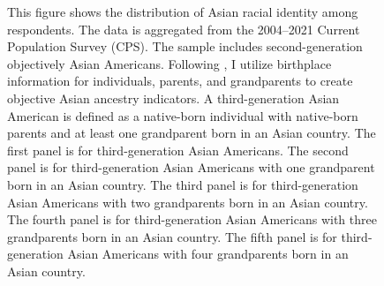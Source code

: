 \begin{landscape}
\begin{figure}[!htb]
\caption*{\footnotesize{This figure shows the distribution of Asian racial identity among respondents. 
The data is aggregated from the 2004--2021 Current Population Survey (CPS). 
The sample includes second-generation objectively Asian Americans.
Following \textcite{antmanEthnicAttritionObserved2016,antmanEthnicAttritionAssimilation2020}, 
I utilize birthplace information for individuals, parents, and grandparents to create objective Asian ancestry indicators.
A third-generation Asian American is defined as a native-born individual with native-born parents and at least one grandparent born in an Asian country. 
The first panel is for third-generation Asian Americans. The second panel is for third-generation Asian Americans with one grandparent born in an Asian country. 
The third panel is for third-generation Asian Americans with two grandparents born in an Asian country. 
The fourth panel is for third-generation Asian Americans with three grandparents born in an Asian country.
The fifth panel is for third-generation Asian Americans with four grandparents born in an Asian country.
}}
\end{figure}
\end{landscape}

\pagebreak
\newpage

